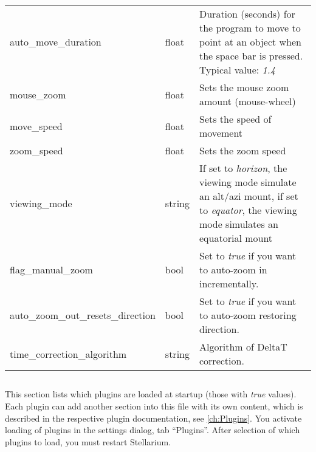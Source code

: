 \begin{longtable}{l|l|p{77mm}}
auto\_move\_duration            & float  & Duration (seconds) for the program to move to point at an object when the space bar is pressed. 
                                           Typical value: \emph{1.4}\\%
mouse\_zoom                     & float  & Sets the mouse zoom amount (mouse-wheel)\\%
move\_speed                     & float  & Sets the speed of movement\\%
zoom\_speed                     & float  & Sets the zoom speed\\%
viewing\_mode                   & string & If set to \emph{horizon}, the viewing mode simulate an alt/azi mount, 
                                           if set to \emph{equator}, the viewing mode simulates an equatorial mount\\%
flag\_manual\_zoom              & bool   & Set to \emph{true} if you want to auto-zoom in incrementally.\\%
auto\_zoom\_out\_resets\_direction & bool & Set to \emph{true} if you want to auto-zoom restoring direction.\\%
time\_correction\_algorithm     & string & Algorithm of DeltaT correction.\\\bottomrule %
\end{longtable}

\subsection{}

This section lists which plugins are loaded at startup (those with
\emph{true} values). Each plugin can add another section into this
file with its own content, which is described in the respective plugin
documentation, see \ref{ch:Plugins}. You activate loading of plugins
in the  settings dialog, tab ``Plugins''. After selection of
which plugins to load, you must restart Stellarium.

